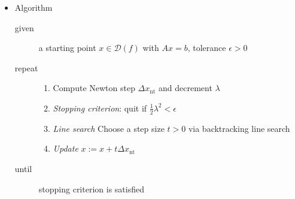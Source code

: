 \begin{itemize}
\begin{itemize}
    \end{itemize}
    \newpage
    \item Algorithm
    \begin{description}
        \item[given] a starting point $x\in\mathcal{D}(f)$ with $Ax=b$, tolerance $\epsilon>0$
        \item[repeat] \phantom{}
        \begin{enumerate}
            \item Compute Newton step $\Delta x_\mathrm{nt}$ and decrement $\lambda$
            \item \textit{Stopping criterion}: quit if $\frac{1}{2}\lambda^2<\epsilon$
            \item \textit{Line search} Choose a step size $t>0$ via backtracking line search
            \item \textit{Update} $x:=x+t\Delta x_\mathrm{nt}$
        \end{enumerate}
        \item[until] stopping criterion is satisfied
    \end{description}
\end{itemize}

